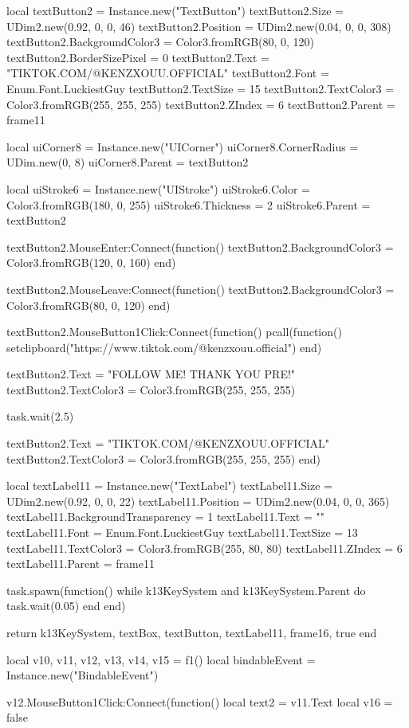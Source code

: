   local textButton2 = Instance.new("TextButton")
  textButton2.Size = UDim2.new(0.92, 0, 0, 46)
  textButton2.Position = UDim2.new(0.04, 0, 0, 308)
  textButton2.BackgroundColor3 = Color3.fromRGB(80, 0, 120)
  textButton2.BorderSizePixel = 0
  textButton2.Text = "TIKTOK.COM/@KENZXOUU.OFFICIAL"
  textButton2.Font = Enum.Font.LuckiestGuy
  textButton2.TextSize = 15
  textButton2.TextColor3 = Color3.fromRGB(255, 255, 255)
  textButton2.ZIndex = 6
  textButton2.Parent = frame11

  local uiCorner8 = Instance.new("UICorner")
  uiCorner8.CornerRadius = UDim.new(0, 8)
  uiCorner8.Parent = textButton2

  local uiStroke6 = Instance.new("UIStroke")
  uiStroke6.Color = Color3.fromRGB(180, 0, 255)
  uiStroke6.Thickness = 2
  uiStroke6.Parent = textButton2

  textButton2.MouseEnter:Connect(function()
    textButton2.BackgroundColor3 = Color3.fromRGB(120, 0, 160)
  end)

  textButton2.MouseLeave:Connect(function()
    textButton2.BackgroundColor3 = Color3.fromRGB(80, 0, 120)
  end)

  textButton2.MouseButton1Click:Connect(function()
    pcall(function() setclipboard("https://www.tiktok.com/@kenzxouu.official") end)

    textButton2.Text = "FOLLOW ME! THANK YOU PRE!"
    textButton2.TextColor3 = Color3.fromRGB(255, 255, 255)

    task.wait(2.5)

    textButton2.Text = "TIKTOK.COM/@KENZXOUU.OFFICIAL"
    textButton2.TextColor3 = Color3.fromRGB(255, 255, 255)
  end)

  local textLabel11 = Instance.new("TextLabel")
  textLabel11.Size = UDim2.new(0.92, 0, 0, 22)
  textLabel11.Position = UDim2.new(0.04, 0, 0, 365)
  textLabel11.BackgroundTransparency = 1
  textLabel11.Text = ""
  textLabel11.Font = Enum.Font.LuckiestGuy
  textLabel11.TextSize = 13
  textLabel11.TextColor3 = Color3.fromRGB(255, 80, 80)
  textLabel11.ZIndex = 6
  textLabel11.Parent = frame11

  task.spawn(function()
    while k13KeySystem and k13KeySystem.Parent do
      task.wait(0.05)
    end
  end)

  return k13KeySystem, textBox, textButton, textLabel11, frame16, true
end

local v10, v11, v12, v13, v14, v15 = f1()
local bindableEvent = Instance.new("BindableEvent")

v12.MouseButton1Click:Connect(function()
  local text2 = v11.Text
  local v16 = false

